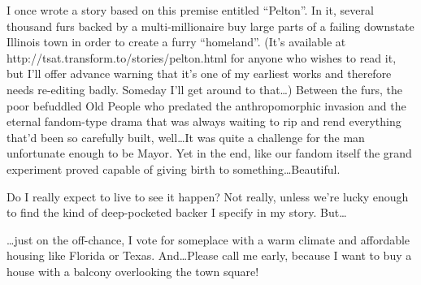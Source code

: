I once wrote a story based on this premise entitled ``Pelton''. In it, several thousand furs backed by a multi-millionaire buy large parts of a failing downstate Illinois town in order to create a furry ``homeland''. (It's available at http://tsat.transform.to/stories/pelton.html for anyone who wishes to read it, but I'll offer advance warning that it's one of my earliest works and therefore needs re-editing badly. Someday I'll get around to that\ldots ) Between the furs, the poor befuddled Old People who predated the anthropomorphic invasion and the eternal fandom-type drama that was always waiting to rip and rend everything that'd been so carefully built, well\ldots  It was quite a challenge for the man unfortunate enough to be Mayor. Yet in the end, like our fandom itself the grand experiment proved capable of giving birth to something\ldots  Beautiful.

Do I really expect to live to see it happen? Not really, unless we're lucky enough to find the kind of deep-pocketed backer I specify in my story. But\ldots

\ldots just on the off-chance, I vote for someplace with a warm climate and affordable housing like Florida or Texas. And\ldots  Please call me early, because I want to buy a house with a balcony overlooking the town square!
